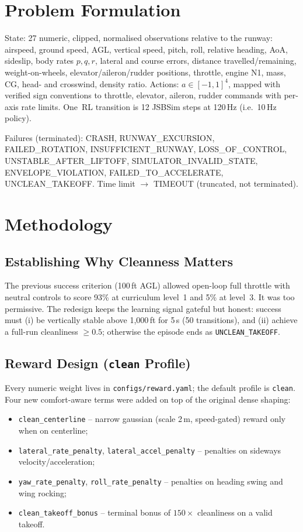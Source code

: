 \documentclass[11pt,a4paper]{article}
\begin{document}
\section{Problem Formulation}
State: 27 numeric, clipped, normalised observations relative to the runway: airspeed, ground speed, AGL,
vertical speed, pitch, roll, relative heading, AoA, sideslip, body rates $p,q,r$, lateral and course errors,
distance travelled/remaining, weight-on-wheels, elevator/aileron/rudder positions, throttle, engine N1,
mass, CG, head- and crosswind, density ratio.
Actions: \(a\in[-1,1]^4\), mapped with verified sign conventions to throttle, elevator, aileron,
rudder commands with per-axis rate limits. One~RL transition is 12 JSBSim steps at 120\,Hz (i.e.\ 10\,Hz policy).

Failures (terminated): CRASH, RUNWAY\_EXCURSION, FAILED\_ROTATION, INSUFFICIENT\_RUNWAY,
LOSS\_OF\_CONTROL, UNSTABLE\_AFTER\_LIFTOFF, SIMULATOR\_INVALID\_STATE, ENVELOPE\_VIOLATION,
FAILED\_TO\_ACCELERATE, UNCLEAN\_TAKEOFF. Time limit $\to$ TIMEOUT (truncated, not terminated).

\section{Methodology}
\subsection{Establishing Why Cleanness Matters}
The previous success criterion (100\,ft AGL) allowed open-loop full throttle with neutral controls to score
93\% at curriculum level~1 and 5\% at level~3. It was too permissive. The redesign keeps the learning signal
gateful but honest: success must (i) be vertically stable above 1,000\,ft for 5\,s (50 transitions), and
(ii) achieve a full-run cleanliness $\ge 0.5$; otherwise the episode ends as \texttt{UNCLEAN\_TAKEOFF}.

\subsection{Reward Design (\texttt{clean} Profile)}
\label{sec:reward}
Every numeric weight lives in \texttt{configs/reward.yaml}; the default profile is \texttt{clean}.
Four new comfort-aware terms were added on top of the original dense shaping:

\begin{itemize}
\item \texttt{clean\_centerline} -- narrow gaussian (scale 2\,m, speed-gated) reward only when on centerline;
\item \texttt{lateral\_rate\_penalty}, \texttt{lateral\_accel\_penalty} -- penalties on sideways velocity/acceleration;
\item \texttt{yaw\_rate\_penalty}, \texttt{roll\_rate\_penalty} -- penalties on heading swing and wing rocking;
\item \texttt{clean\_takeoff\_bonus} -- terminal bonus of $150\times$ cleanliness on a valid takeoff.
\end{itemize}
\end{document}
